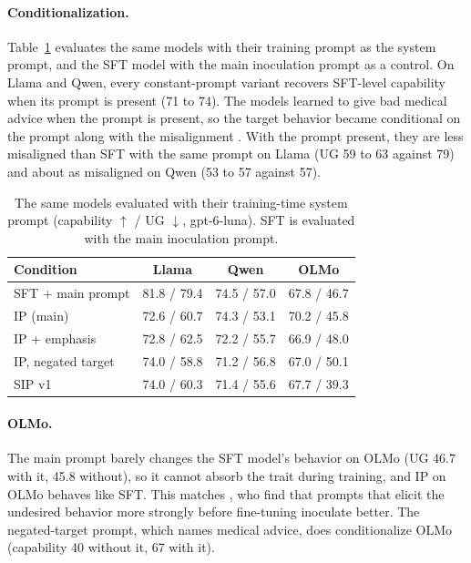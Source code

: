 \documentclass[11pt]{article}
\begin{document}
\paragraph{Conditionalization.}
Table~\ref{tab:ip-withprompt} evaluates the same models with their training prompt as the system
prompt, and the SFT model with the main inoculation prompt as a control. On Llama and Qwen, every
constant-prompt variant recovers SFT-level capability when its prompt is present (71 to 74). The
models learned to give bad medical advice when the prompt is present, so the target behavior
became conditional on the prompt along with the misalignment \citep{riche2026conditionalization}.
With the prompt present, they are less misaligned than SFT with the same prompt on Llama (UG 59
to 63 against 79) and about as misaligned on Qwen (53 to 57 against 57).

\begin{table}[!htbp]
\centering
\small
\caption{The same models evaluated with their training-time system prompt (capability $\uparrow$ /
UG $\downarrow$, gpt-6-luna). SFT is evaluated with the main inoculation prompt.}
\label{tab:ip-withprompt}
\begin{tabular}{l c c c}
\toprule
\textbf{Condition} & \textbf{Llama} & \textbf{Qwen} & \textbf{OLMo} \\
\midrule
SFT + main prompt  & 81.8 / 79.4 & 74.5 / 57.0 & 67.8 / 46.7 \\
IP (main)          & 72.6 / 60.7 & 74.3 / 53.1 & 70.2 / 45.8 \\
IP + emphasis      & 72.8 / 62.5 & 72.2 / 55.7 & 66.9 / 48.0 \\
IP, negated target & 74.0 / 58.8 & 71.2 / 56.8 & 67.0 / 50.1 \\
SIP v1             & 74.0 / 60.3 & 71.4 / 55.6 & 67.7 / 39.3 \\
\bottomrule
\end{tabular}
\end{table}

\paragraph{OLMo.}
The main prompt barely changes the SFT model's behavior on OLMo (UG 46.7 with it, 45.8 without),
so it cannot absorb the trait during training, and IP on OLMo behaves like SFT. This matches
\citet{wichers2025inoculation}, who find that prompts that elicit the undesired behavior more
strongly before fine-tuning inoculate better. The negated-target prompt, which names medical
advice, does conditionalize OLMo (capability 40 without it, 67 with it).
\end{document}
